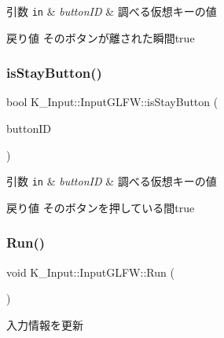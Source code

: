 \begin{DoxyParams}[1]{引数}
\mbox{\tt in}  & {\em button\+ID} & 調べる仮想キーの値 \\
\hline
\end{DoxyParams}
\begin{DoxyReturn}{戻り値}
そのボタンが離された瞬間true 
\end{DoxyReturn}
\mbox{\label{class_k___input_1_1_input_g_l_f_w_a09054346958c6a88196146cb3e3d9d08}} 
\subsubsection{\texorpdfstring{is\+Stay\+Button()}{isStayButton()}}
{\footnotesize\ttfamily bool K\+\_\+\+Input\+::\+Input\+G\+L\+F\+W\+::is\+Stay\+Button (\begin{DoxyParamCaption}\item[{\mbox{\hyperlink{namespace_k___input_a2a6df758ee5a36c29d234fe7a27beb2c}{Button\+ID}}}]{button\+ID }\end{DoxyParamCaption})}


\begin{DoxyParams}[1]{引数}
\mbox{\tt in}  & {\em button\+ID} & 調べる仮想キーの値 \\
\hline
\end{DoxyParams}
\begin{DoxyReturn}{戻り値}
そのボタンを押している間true 
\end{DoxyReturn}
\mbox{\label{class_k___input_1_1_input_g_l_f_w_a2e6aca10a49dfac3a8d49143910e0a2a}} 
\subsubsection{\texorpdfstring{Run()}{Run()}}
{\footnotesize\ttfamily void K\+\_\+\+Input\+::\+Input\+G\+L\+F\+W\+::\+Run (\begin{DoxyParamCaption}{ }\end{DoxyParamCaption})}



入力情報を更新 

